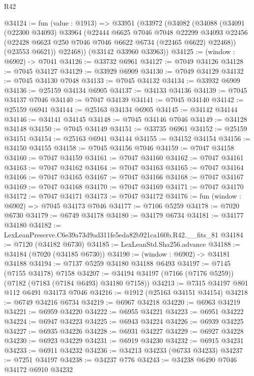 \begin{lexlean}{R42}
\begin{coremodule}
{@34124 := fun (value : @1913) =>
  @33951
    (@33972
      (@34082
        (@34088
          (@34091
            (@22300 @34093)
            @33964
            (@22444
              @6625
              @7046
              @7048
              @22299
              @34093
              @22456
              (@22428 @6623 @250 @7046 @7046 @6622 @6734 (@22465 @6622) @22468))
            (@23553 @6621))
          @22468))
      (@33142 @33960 @33963))
@34125 := (window : @6902) -> @7041
@34126 := @33732 @6961
@34127 := @7049 @34126
@34128 := @7045 @34127
@34129 := @33929 @6909
@34130 := @7049 @34129
@34132 := @7045 @34130 @7048
@34133 := @7045 @34132
@34134 := @33932 @6909
@34136 := @25159 @34134 @6905
@34137 := @34133 @34136
@34139 := @7045 @34137 @7046
@34140 := @7047 @34139
@34141 := @7045 @34140
@34142 := @25159 @6941
@34144 := @25163 @34134 @6905
@34145 := @34142 @34144
@34146 := @34141 @34145
@34148 := @7045 @34146 @7046
@34149 := @34128 @34148
@34150 := @7045 @34149
@34151 := @33735 @6961
@34152 := @25159 @34151
@34154 := @25163 @6941 @34144
@34155 := @34152 @34154
@34156 := @34150 @34155
@34158 := @7045 @34156 @7046
@34159 := @7047 @34158
@34160 := @7047 @34159
@34161 := @7047 @34160
@34162 := @7047 @34161
@34163 := @7047 @34162
@34164 := @7047 @34163
@34165 := @7047 @34164
@34166 := @7047 @34165
@34167 := @7047 @34166
@34168 := @7047 @34167
@34169 := @7047 @34168
@34170 := @7047 @34169
@34171 := @7047 @34170
@34172 := @7047 @34171
@34173 := @7047 @34172
@34176 := fun (window : @6902) => @7045 @34173 @7046
@34177 := @7106 @5259
@34178 := @7020 @6730
@34179 := @6749 @34178
@34180 := @34179 @6734
@34181 := @34177 @34180
@34182 := LexLeanPreserve.C6e39a73d9ad311fe5eda82b921ca160b.R42.__fits_81
@34184 := @7120 (@34182 @6730)
@34185 := LexLeanStd.Sha256.advance
@34188 := @34184 (@7020 (@34185 @6730))
@34190 := (window : @6902) -> @34181 @34188
@34194 := @7137 @5259 @34180 @34188 @6493
@34197 := @7145 (@7155 @34178) @7158
@34207 := @34194 @34197 (@7166 (@7176 @5259)) (@7182 (@7183 (@7184 @6493) @34180 @7158))
@34213 := @7315 @34197 @801 @112 @6491 @34173 @7046
@34216 := @1912 (@25163 @34151 @34154)
@34218 := @6749 @34216 @6734
@34219 := @6967 @34218
@34220 := @6963 @34219
@34221 := @6959 @34220
@34222 := @6955 @34221
@34223 := @6951 @34222
@34224 := @6947 @34223
@34225 := @6943 @34224
@34226 := @6939 @34225
@34227 := @6935 @34226
@34228 := @6931 @34227
@34229 := @6927 @34228
@34230 := @6923 @34229
@34231 := @6919 @34230
@34232 := @6915 @34231
@34233 := @6911 @34232
@34236 := @34213 @34233 (@6733 @34233)
@34237 := @7251 @34197
@34238 := @34237 @776
@34243 := @34238 @6490 @7046 @34172 @6910 @34232
}
\end{coremodule}
\end{lexlean}
